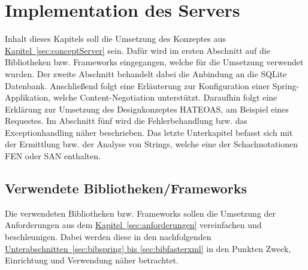
\chapter{Implementation des Servers}
Inhalt dieses Kapitels soll die Umsetzung des Konzeptes aus \hyperref[sec:conceptServer]{Kapitel~\ref{sec:conceptServer}} sein. Dafür wird im ersten Abschnitt auf die Bibliotheken bzw. Frameworks eingegangen, welche für die Umsetzung verwendet wurden. Der zweite Abschnitt behandelt dabei die Anbindung an die SQLite Datenbank. Anschließend folgt eine Erläuterung zur Konfiguration einer Spring-Applikation, welche Content-Negotiation unterstützt. Daraufhin folgt eine Erklärung zur Umsetzung des Designkonzeptes HATEOAS, am Beispiel eines Requestes. Im Abschnitt fünf wird die Fehlerbehandlung bzw. das Exceptionhandling näher beschrieben. Das letzte Unterkapitel befasst sich mit der Ermittlung bzw. der Analyse von Strings, welche eine der Schachnotationen \gls{FEN} oder \gls{SAN} enthalten.

\section{Verwendete Bibliotheken/Frameworks}
Die verwendeten Bibliotheken bzw. Frameworks sollen die Umsetzung der Anforderungen aus dem \hyperref[sec:anforderungen]{Kapitel~\ref{sec:anforderungen}} vereinfachen und beschleunigen. Dabei werden diese in den nachfolgenden \hyperref[sec:bibspring, sec:bibfasterxml]{Unterabschnitten~\ref{sec:bibspring} bis \ref{sec:bibfasterxml}} in den Punkten Zweck, Einrichtung und Verwendung näher betrachtet. 

